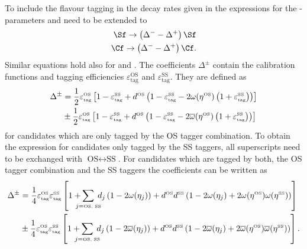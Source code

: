 To include the flavour tagging in the decay rates given in  the expressions for the \CP-parameters \Sf and \Cf need to be extended to
\begin{equation}
\begin{aligned}
\Sf\to\left(\Delta^--\Delta^+\right)\Sf\\
\Cf\to\left(\Delta^--\Delta^+\right)\Cf.\label{eq:decRateCorrectFT}
\end{aligned}
\end{equation}
Similar equations hold also for \Sfbar and \Cfbar.
The coefficients $\Delta^\pm$ contain the calibration functions and tagging efficiencies $\varepsilon_{\text{tag}}^{\text{OS}}$ and $\varepsilon_{\text{tag}}^{\text{SS}}$.
They are defined as
\begin{align}
\Delta^\pm&=\frac{1}{2}\varepsilon_{\text{\tiny tag}}^{\text{\tiny OS}}\left[1-\varepsilon_{\text{\tiny tag}}^{\text{\tiny SS}}+d^{\text{\tiny OS}}\left(1-\varepsilon_{\text{\tiny tag}}^{\text{\tiny SS}}-2\omega(\eta^{\text{\tiny OS}})\left(1+\varepsilon_{\text{\tiny tag}}^{\text{\tiny SS}}\right)\right)\right]\nonumber\\
&\pm\frac{1}{2}\varepsilon_{\text{\tiny tag}}^{\text{\tiny OS}}\left[1-\varepsilon_{\text{\tiny tag}}^{\text{\tiny SS}}+d^{\text{\tiny OS}}\left(1-\varepsilon_{\text{\tiny tag}}^{\text{\tiny SS}}-2\overline{\omega}(\eta^{\text{\tiny OS}})\left(1+\varepsilon_{\text{\tiny tag}}^{\text{\tiny SS}}\right)\right)\right]
\end{align}
for candidates which are only tagged by the OS tagger combination.
To obtain the expression for candidates only tagged by the SS taggers, all superscripts need to be exchanged with $\text{OS}\leftrightarrow\text{SS}$.
For candidates which are tagged by both, the OS tagger combination and the SS taggers the coefficients can be written as
\begin{align}
\Delta^\pm&=\frac{1}{4}\varepsilon_{\text{\tiny tag}}^{\text{\tiny OS}}\varepsilon_{\text{\tiny tag}}^{\text{\tiny SS}}\left[1+\hspace{-3mm}\sum_{j=\text{\tiny OS, SS}}\hspace{-2mm}d_j\left(1-2\omega(\eta_j)\right)+d^{\text{\tiny OS}}d^{\text{\tiny SS}}\left(1-2\omega(\eta_j)+2\omega(\eta^{\text{\tiny OS}})\omega(\eta^{\text{\tiny SS}})\right)\right]\nonumber\\
&\pm\frac{1}{4}\varepsilon_{\text{\tiny tag}}^{\text{\tiny OS}}\varepsilon_{\text{\tiny tag}}^{\text{\tiny SS}}\left[1+\hspace{-3mm}\sum_{j=\text{\tiny OS, SS}}\hspace{-2mm}d_j\left(1-2\overline{\omega}(\eta_j)\right)+d^{\text{\tiny OS}}d^{\text{\tiny SS}}\left(1-2\overline{\omega}(\eta_j)+2\overline{\omega}(\eta^{\text{\tiny OS}})\overline{\omega}(\eta^{\text{\tiny SS}})\right)\right].
\end{align}

